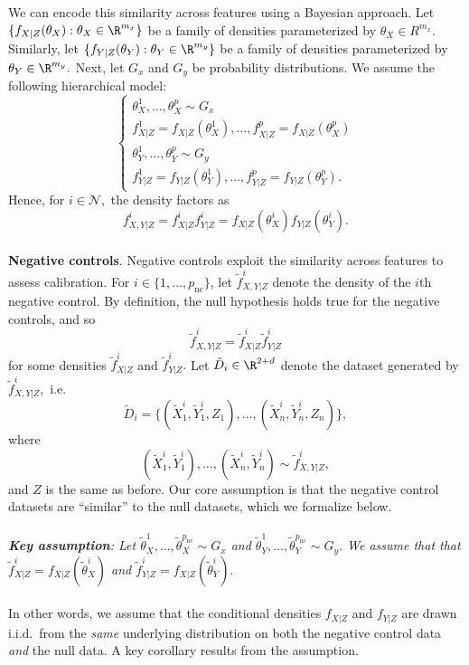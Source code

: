 \documentclass[12pt]{article}
\begin{document}
We can encode this similarity across features using a Bayesian approach. Let $\{f_{X|Z}(\theta_X) : \theta_X \in \R^{m_x} \}$ be a family of densities parameterized by $\theta_X \in R^{m_x}.$ Similarly, let $\{ f_{Y|Z}(\theta_Y) : \theta_Y \in \R^{m_y} \}$ be a family of densities parameterized by $\theta_Y \in \R^{m_y}.$ Next, let $G_x$ and $G_y$ be probability distributions. We assume the following hierarchical model:
$$ 
\begin{cases}
\theta_X^1, \dots, \theta_X^p \sim G_x \\
f^1_{X|Z} = f_{X|Z}(\theta_X^1), \dots, f^p_{X|Z} = f_{X|Z}(\theta_X^p)
\\ 
 \theta^1_Y, \dots, \theta_Y^p \sim G_y
 \\ 
 f^1_{Y|Z} = f_{Y|Z}(\theta_Y^1), \dots, f^p_{Y|Z} = f_{Y|Z}(\theta_Y^p).
\end{cases}
$$
Hence, for $i \in \mathcal{N},$ the density factors as 
$$ f_{X,Y|Z}^i = f^i_{X|Z} f^i_{Y|Z} = f_{X|Z}(\theta_X^i) f_{Y|Z}(\theta_Y^i).$$
\\
\noindent
\textbf{Negative controls}. Negative controls exploit the similarity across features to assess calibration. For $i \in \{1, \dots, p_\textrm{nc} \}$, let $\tilde{f}^i_{X,Y|Z}$ denote the density of the $i$th negative control. By definition, the null hypothesis holds true for the negative controls, and so 
$$\tilde{f}^i_{X,Y|Z} = \tilde{f}^i_{X|Z} \tilde{f}^i_{Y|Z}$$ for some densities $\tilde{f}^i_{X|Z}$ and $\tilde{f}^i_{Y|Z}.$ Let $\tilde{D}_i \in \R^{2 + d}$ denote the dataset generated by $\tilde{f}^i_{X,Y|Z},$ i.e.
$$ \tilde{D}_i = \{ (\tilde{X}^i_1, \tilde{Y}^i_1, Z_1), \dots, (\tilde{X}^i_n, \tilde{Y}^i_n, Z_n)\},$$ where $$ (\tilde{X}^i_1, \tilde{Y}^i_1), \dots, (\tilde{X}^i_n, \tilde{Y}^i_n) \sim \tilde{f}^i_{X,Y|Z},$$ and $Z$ is the same as before. Our core assumption is that the negative control datasets are ``similar'' to the null datasets, which we formalize below.
\\ \\
\textit{\textbf{Key assumption}: Let $\tilde{\theta}^1_X, \dots, \tilde{\theta}^{p_\textrm{nc}}_X \sim G_x$ and $\tilde{\theta}^1_Y, \dots, \tilde{\theta}_Y^{p_\textrm{nc}} \sim G_y.$ We assume that that $\tilde{f}^i_{X|Z} = f_{X|Z}( \tilde{\theta}^i_X ) $ and $\tilde{f}^i_{Y|Z} = f_{X|Z}(\tilde{ \theta}^i_Y).$}
\\ \\
In other words, we assume that the conditional densities $f_{X|Z}$ and $f_{Y|Z}$ are drawn i.i.d.\ from the \textit{same} underlying distribution on both the negative control data \textit{and} the null data. A key corollary results from the assumption.
\end{document}
